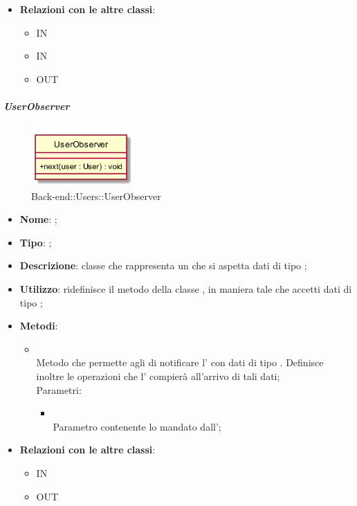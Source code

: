 \begin{itemize}
\begin{itemize}
\begin{itemize}
		\end{itemize}
	\end{itemize}
	\item \textbf{Relazioni con le altre classi}:
	\begin{itemize}
		\item IN \hyperlink{<<interface>> UsersDAO_label}{}
		\item IN \hyperlink{UsersDAODynamoDB_label}{}
		\item OUT \hyperlink{UserObserver_label}{}
	\end{itemize}
\end{itemize}
\FloatBarrier

\hypertarget{UserObserver_label}{\subparagraph{UserObserver}}
\begin{figure}[h]
	\centering
	\includegraphics[width=0.35\textwidth,height=\textheight,keepaspectratio]{images/ClassUserObserver.png}
	\caption{Back-end::Users::UserObserver}
\end{figure}
\begin{itemize}
	\item \textbf{Nome}: ;
	\item \textbf{Tipo}: ;
	\item \textbf{Descrizione}: classe che rappresenta un  che si aspetta dati di tipo ;
	\item \textbf{Utilizzo}: ridefinisce il metodo  della classe , in maniera tale che accetti dati di tipo ;
	\item \textbf{Metodi}:
	\begin{itemize}
		\item[]  \\		Metodo che permette agli  di notificare l' con dati di tipo . Definisce inoltre le operazioni che l' compierà all'arrivo di tali dati;\\
		Parametri:
		\begin{itemize}
			\item {} \\
			Parametro contenente lo  mandato dall';
		\end{itemize}
	\end{itemize}
	\item \textbf{Relazioni con le altre classi}:
	\begin{itemize}
		\item IN \hyperlink{UserObservable_label}{}
		\item OUT \hyperlink{User_label}{}
	\end{itemize}
\end{itemize}
\FloatBarrier

